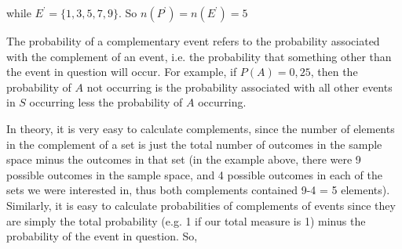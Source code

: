 while \begin{math}{E}^{\text{'}}=\{1,3,5,7,9\}\end{math}. So \begin{math}n\left({P}^{\text{'}}\right)=n\left({E}^{\text{'}}\right)=5\end{math}\par \label{m39377*eip-324}The probability of a complementary event refers to the
probability associated with the complement of an event, i.e. the probability that something other than the event in question will occur. For example, if \begin{math}P\left(A\right)=0,25\end{math},
then the probability of \begin{math}A\end{math} not
occurring is the probability associated with all other events in \begin{math}S\end{math} occurring less the probability of
\begin{math}A\end{math} occurring.\par \label{m39377*eip-788}In
theory, it is very easy to calculate complements, since the number of elements
in the complement of a set is just the total number of outcomes in the sample
space minus the outcomes in that set (in the example above, there were 9
possible outcomes in the sample space, and 4 possible outcomes in each of the
sets we were interested in, thus both complements contained 9-4 = 5 elements).
Similarly, it is easy to calculate probabilities of complements of events since
they are simply the total probability (e.g. 1 if our total measure is 1) minus the probability of the event in question. So,\par \label{m39377*eip-936}\nopagebreak\noindent{}
    
